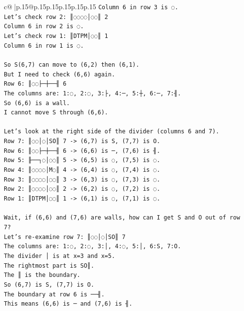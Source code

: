 \documentclass{article}
\begin{document}
{\begin{supertabular}{c@{$\;$}|p{.15\linewidth}@{}p{.15\linewidth}p{.15\linewidth}p{.15\linewidth}p{.15\linewidth}p{.15\linewidth}}
{{{\texttt{Column 6 in row 3 is ◌.} \\
\texttt{Let's check row 2: ║◌◌◌◌│◌◌║ 2} \\
\texttt{Column 6 in row 2 is ◌.} \\
\texttt{Let's check row 1: ║DTPM│◌◌║ 1} \\
\texttt{Column 6 in row 1 is ◌.} \\
\\ 
\texttt{So S(6,7) can move to (6,2) then (6,1).} \\
\texttt{But I need to check (6,6) again.} \\
\texttt{Row 6: ║◌◌├─┼──╢ 6} \\
\texttt{The columns are: 1:◌, 2:◌, 3:├, 4:─, 5:┼, 6:─, 7:╢.} \\
\texttt{So (6,6) is a wall.} \\
\texttt{I cannot move S through (6,6).} \\
\\ 
\texttt{Let's look at the right side of the divider (columns 6 and 7).} \\
\texttt{Row 7: ║◌◌│◌│SO║ 7 {-}> (6,7) is S, (7,7) is O.} \\
\texttt{Row 6: ║◌◌├─┼──╢ 6 {-}> (6,6) is ─, (7,6) is ╢.} \\
\texttt{Row 5: ╟──┐◌│◌◌║ 5 {-}> (6,5) is ◌, (7,5) is ◌.} \\
\texttt{Row 4: ║◌◌◌◌│M◌║ 4 {-}> (6,4) is ◌, (7,4) is ◌.} \\
\texttt{Row 3: ║◌◌◌◌│◌◌║ 3 {-}> (6,3) is ◌, (7,3) is ◌.} \\
\texttt{Row 2: ║◌◌◌◌│◌◌║ 2 {-}> (6,2) is ◌, (7,2) is ◌.} \\
\texttt{Row 1: ║DTPM│◌◌║ 1 {-}> (6,1) is ◌, (7,1) is ◌.} \\
\\ 
\texttt{Wait, if (6,6) and (7,6) are walls, how can I get S and O out of row 7?} \\
\texttt{Let's re{-}examine row 7: ║◌◌│◌│SO║ 7} \\
\texttt{The columns are: 1:◌, 2:◌, 3:│, 4:◌, 5:│, 6:S, 7:O.} \\
\texttt{The divider │ is at x=3 and x=5.} \\
\texttt{The rightmost part is SO║.} \\
\texttt{The ║ is the boundary.} \\
\texttt{So (6,7) is S, (7,7) is O.} \\
\texttt{The boundary at row 6 is ──╢.} \\
\texttt{This means (6,6) is ─ and (7,6) is ╢.} \\
}}}
\end{supertabular}}
\end{document}
